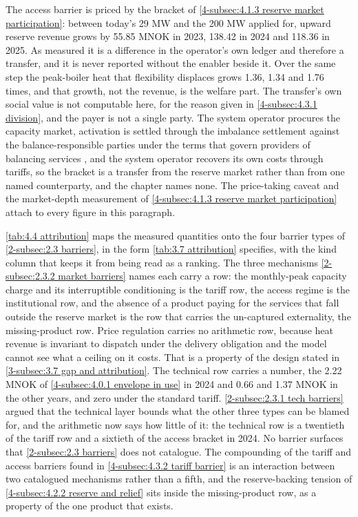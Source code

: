The access barrier is priced by the bracket of \autoref{4-subsec:4.1.3 reserve market participation}: between today's 29 MW and the 200 MW applied for, upward reserve revenue grows by 55.85 MNOK in 2023, 138.42 in 2024 and 118.36 in 2025. As measured it is a difference in the operator's own ledger and therefore a transfer, and it is never reported without the enabler beside it. Over the same step the peak-boiler heat that flexibility displaces grows 1.36, 1.34 and 1.76 times, and that growth, not the revenue, is the welfare part. The transfer's own social value is not computable here, for the reason given in \autoref{4-subsec:4.3.1 division}, and the payer is not a single party. The system operator procures the capacity market, activation is settled through the imbalance settlement against the balance-responsible parties under the terms that govern providers of balancing services \cite{statnett_forslag_2025}, and the system operator recovers its own costs through tariffs, so the bracket is a transfer from the reserve market rather than from one named counterparty, and the chapter names none. The price-taking caveat and the market-depth measurement of \autoref{4-subsec:4.1.3 reserve market participation} attach to every figure in this paragraph.

\autoref{tab:4.4 attribution} maps the measured quantities onto the four barrier types of \autoref{2-subsec:2.3 barriers}, in the form \autoref{tab:3.7 attribution} specifies, with the kind column that keeps it from being read as a ranking. The three mechanisms \autoref{2-subsec:2.3.2 market barriers} names each carry a row: the monthly-peak capacity charge and its interruptible conditioning is the tariff row, the access regime is the institutional row, and the absence of a product paying for the services that fall outside the reserve market is the row that carries the un-captured externality, the missing-product row. Price regulation carries no arithmetic row, because heat revenue is invariant to dispatch under the delivery obligation and the model cannot see what a ceiling on it costs. That is a property of the design stated in \autoref{3-subsec:3.7 gap and attribution}. The technical row carries a number, the 2.22 MNOK of \autoref{4-subsec:4.0.1 envelope in use} in 2024 and 0.66 and 1.37 MNOK in the other years, and zero under the standard tariff. \autoref{2-subsec:2.3.1 tech barriers} argued that the technical layer bounds what the other three types can be blamed for, and the arithmetic now says how little of it: the technical row is a twentieth of the tariff row and a sixtieth of the access bracket in 2024. No barrier surfaces that \autoref{2-subsec:2.3 barriers} does not catalogue. The compounding of the tariff and access barriers found in \autoref{4-subsec:4.3.2 tariff barrier} is an interaction between two catalogued mechanisms rather than a fifth, and the reserve-backing tension of \autoref{4-subsec:4.2.2 reserve and relief} sits inside the missing-product row, as a property of the one product that exists.

